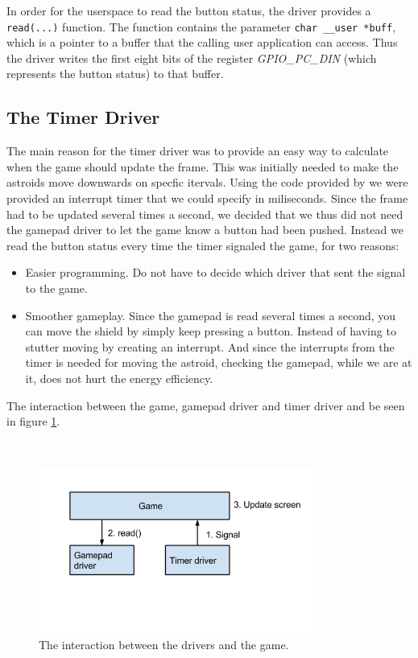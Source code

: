 In order for the userspace to read the button status, the driver provides a \texttt{read(...)} function. The function contains the parameter \texttt{char \_\_user *buff}, which is a pointer to a buffer that the calling user application can access. Thus the driver writes the first eight bits of the register \textit{GPIO\_PC\_DIN} (which represents the button status) to that buffer.

\subsection{The Timer Driver}

The main reason for the timer driver was to provide an easy way to calculate when the game should update the frame. This was initially needed to make the astroids move downwards on specfic itervals. Using the code provided by \cite{timerguide} we were provided an interrupt timer that we could specify in miliseconds. Since the frame had to be updated several times a second, we decided that we thus did not need the gamepad driver to let the game know a button had been pushed. Instead we read the button status every time the timer signaled the game, for two reasons: 

\begin{itemize}
	\item Easier programming. Do not have to decide which driver that sent the signal to the game.
	\item Smoother gameplay. Since the gamepad is read several times a second, you can move the shield by simply keep pressing a button. Instead of having to stutter moving by creating an interrupt. And since the interrupts from the timer is needed for moving the astroid, checking the gamepad, while we are at it, does not hurt the energy efficiency. 
\end{itemize}

The interaction between the game, gamepad driver and timer driver and be seen in figure \ref{game_drivers}.

\hfill \\

\begin{figure}[ht]
    \centering
      \includegraphics[width=9cm]{figures/Drivers_gamepad_interact}
    \caption{The interaction between the drivers and the game.}
    \label{game_drivers}
\end{figure}


